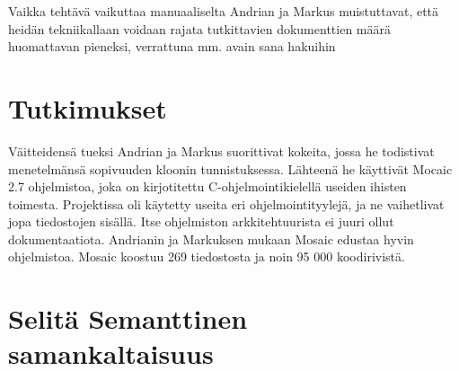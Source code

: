 \documentclass[finnish]{../tktltiki2}
\theoremstyle{definition}
\theoremstyle{remark}
\begin{document}
Vaikka tehtävä vaikuttaa manuaaliselta Andrian ja Markus muistuttavat, että heidän tekniikallaan voidaan rajata
tutkittavien dokumenttien määrä huomattavan pieneksi, verrattuna mm. avain sana hakuihin

\section{Tutkimukset}
Väitteidensä tueksi Andrian ja Markus suorittivat kokeita, jossa he todistivat menetelmänsä sopivuuden kloonin
tunnistuksessa.
Lähteenä he käyttivät Mocaic 2.7 ohjelmistoa, joka on kirjotitettu C-ohjelmointikielellä useiden ihisten toimesta.
Projektissa oli käytetty useita eri ohjelmointityylejä, ja ne vaihetlivat jopa tiedostojen sisällä. Itse ohjelmiston
arkkitehtuurista ei juuri ollut dokumentaatiota. Andrianin ja Markuksen mukaan Mosaic edustaa hyvin ohjelmistoa.
Mosaic koostuu 269 tiedostosta ja noin 95 000 koodirivistä.




\section{Selitä Semanttinen samankaltaisuus}



















\end{document}
